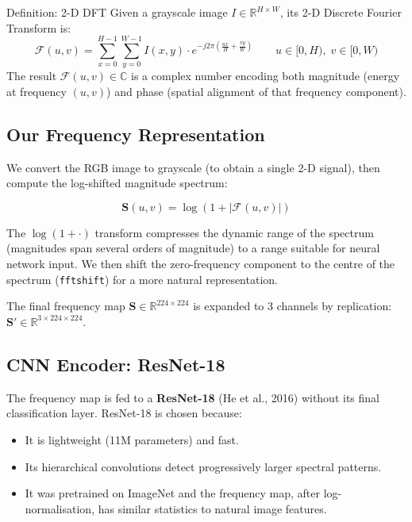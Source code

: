 \documentclass[12pt,a4paper]{article}
\begin{document}
\begin{definitionbox}{Definition: 2-D DFT}
Given a grayscale image $I \in \mathbb{R}^{H \times W}$, its 2-D Discrete Fourier
Transform is:
\begin{equation}
  \mathcal{F}(u, v) = \sum_{x=0}^{H-1} \sum_{y=0}^{W-1}
  I(x,y) \cdot e^{-j2\pi\left(\frac{ux}{H} + \frac{vy}{W}\right)}
  \qquad u \in [0, H), \; v \in [0, W)
\end{equation}
The result $\mathcal{F}(u,v) \in \mathbb{C}$ is a complex number encoding both magnitude
(energy at frequency $(u,v)$) and phase (spatial alignment of that frequency component).
\end{definitionbox}

\subsection{Our Frequency Representation}

We convert the RGB image to grayscale (to obtain a single 2-D signal), then compute the
log-shifted magnitude spectrum:

\begin{equation}
  \mathbf{S}(u,v) = \log\!\left(1 + |\mathcal{F}(u,v)|\right)
  \label{eq:logspec}
\end{equation}

The $\log(1 + \cdot)$ transform compresses the dynamic range of the spectrum
(magnitudes span several orders of magnitude) to a range suitable for neural network
input. We then shift the zero-frequency component to the centre of the spectrum
(\texttt{fftshift}) for a more natural representation.

The final frequency map $\mathbf{S} \in \mathbb{R}^{224 \times 224}$ is expanded to
3 channels by replication: $\mathbf{S}' \in \mathbb{R}^{3 \times 224 \times 224}$.

\subsection{CNN Encoder: ResNet-18}

The frequency map is fed to a \textbf{ResNet-18} (He et al., 2016) without its final
classification layer. ResNet-18 is chosen because:

\begin{itemize}[leftmargin=1.5em]
  \item It is lightweight (11M parameters) and fast.
  \item Its hierarchical convolutions detect progressively larger spectral patterns.
  \item It was pretrained on ImageNet and the frequency map, after log-normalisation,
    has similar statistics to natural image features.
\end{itemize}
\end{document}
